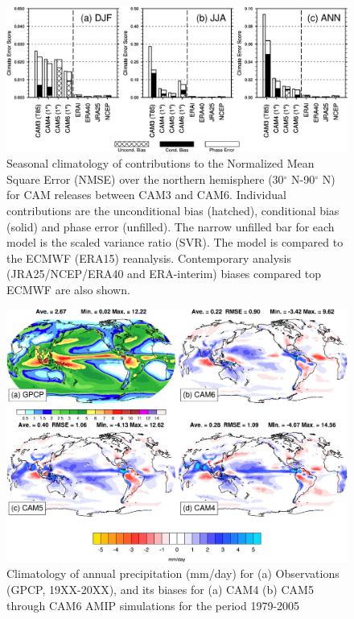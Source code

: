 %
%
%
%
%
%

\clearpage
\begin{figure}[t]
  \begin{center}
    \includegraphics[width=1\textwidth,angle=0.]{./figs/f_skill_score.pdf}
 \end{center}
  \caption {Seasonal climatology of contributions to the Normalized Mean Square Error (NMSE) over the northern hemisphere (30$^\circ$ N-90$^\circ$ N) for CAM releases between CAM3 and CAM6. Individual contributions are the unconditional bias (hatched), conditional bias (solid) and phase error (unfilled). The narrow unfilled bar for each model is the scaled variance ratio (SVR). The model is compared to the ECMWF (ERA15) reanalysis. Contemporary analysis (JRA25/NCEP/ERA40 and ERA-interim) biases compared top ECMWF are also shown.} 
\label{f_skill_score}
\end{figure} 
\clearpage
\begin{figure}[t]
  \begin{center}
    \includegraphics[width=1.\textwidth,angle=0.]{./figs/f_PRECT_2D_CAM456.pdf}
  \end{center}
  \caption{Climatology of annual precipitation (mm/day) for (a) Observations (GPCP, 19XX-20XX), and its biases for (a) CAM4 (b) CAM5  through CAM6 AMIP simulations for the period 1979-2005} 
\label{f_PRECT_2D_CAM456}
\end{figure} 

